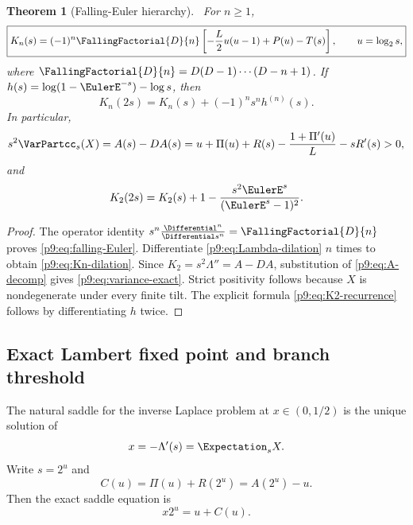 \documentclass[11pt]{article}
\numberwithin{equation}{section}
\newtheorem{theorem}{Theorem}[section]
\theoremstyle{definition}
\theoremstyle{remark}
\begin{document}
\begin{theorem}[Falling-Euler hierarchy]\label{p9:thm:falling-Euler}
\statusN\ For $n\ge1$,
\begin{equation}
 \boxed{
 K_n(s)=(-1)^n\FallingFactorial{D}{n}
 \left[-\frac L2u(u-1)+P(u)-T(s)\right],
 \qquad u=\log_2s,}                                       \label{p9:eq:falling-Euler}
\end{equation}
where $\FallingFactorial{D}{n}=D(D-1)\cdots(D-n+1)$.  If
$h(s)=\log(1-\EulerE^{-s})-\log s$, then
\begin{equation}
 \boxed{K_n(2s)=K_n(s)+(-1)^ns^nh^{(n)}(s).}               \label{p9:eq:Kn-dilation}
\end{equation}
In particular,
\begin{equation}
 s^2\VarPartcc_s(X)
 =A(s)-DA(s)
 =u+\Pi(u)+R(s)-\frac{1+\Pi'(u)}L-sR'(s)>0,                \label{p9:eq:variance-exact}
\end{equation}
and
\begin{equation}
 K_2(2s)=K_2(s)+1-\frac{s^2\EulerE^s}{(\EulerE^s-1)^2}.             \label{p9:eq:K2-recurrence}
\end{equation}
\end{theorem}

\begin{proof}
The operator identity $s^n\frac{\Differential^n}{\Differential s^n}=\FallingFactorial{D}{n}$ proves
\eqref{p9:eq:falling-Euler}.  Differentiate \eqref{p9:eq:Lambda-dilation} $n$ times to obtain
\eqref{p9:eq:Kn-dilation}.  Since $K_2=s^2\Lambda''=A-DA$, substitution of
\eqref{p9:eq:A-decomp} gives \eqref{p9:eq:variance-exact}.  Strict positivity follows because
$X$ is nondegenerate under every finite tilt.  The explicit formula
\eqref{p9:eq:K2-recurrence} follows by differentiating $h$ twice.
\end{proof}

\subsection{Exact Lambert fixed point and branch threshold}
The natural saddle for the inverse Laplace problem at $x\in(0,1/2)$ is the unique solution
of
\begin{equation}
 x=-\Lambda'(s)=\Expectation_sX.                                    \label{p9:eq:saddle-s}
\end{equation}
Write $s=2^u$ and
\begin{equation}
 C(u)=\Pi(u)+R(2^u)=A(2^u)-u.                              \label{p9:eq:C-u}
\end{equation}
Then the exact saddle equation is
\begin{equation}
 x2^u=u+C(u).                                               \label{p9:eq:saddle-u}
\end{equation}
\end{document}
